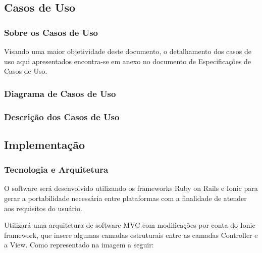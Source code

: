 
\subsection{Casos de Uso}

\subsubsection{Sobre os Casos de Uso}
\par Visando uma maior objetividade deste documento, o detalhamento dos casos de uso aqui apresentados encontra-se em anexo no documento de Especificações de Casos de Uso.

\subsubsection{Diagrama de Casos de Uso}


\subsubsection{Descrição dos Casos de Uso}


\subsection{Implementação}
\subsubsection{Tecnologia e Arquitetura}
\par O software será desenvolvido utilizando os frameworks Ruby on Rails e Ionic para gerar a portabilidade necessária entre plataformas com a finalidade de atender aos requisitos do usuário.
\par Utilizará uma arquitetura de software MVC com modificações por conta do Ionic framework, que insere algumas camadas estruturais entre as camadas Controller e a View. Como representado na imagem a seguir:


